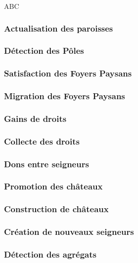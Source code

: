 ABC

\subsubsection{Actualisation des paroisses}

\subsubsection{Détection des Pôles}

\subsubsection{Satisfaction des Foyers Paysans}

\subsubsection{Migration des Foyers Paysans}

\subsubsection{Gains de droits}

\subsubsection{Collecte des droits}

\subsubsection{Dons entre seigneurs}

\subsubsection{Promotion des châteaux}

\subsubsection{Construction de châteaux}

\subsubsection{Création de nouveaux seigneurs}

\subsubsection{Détection des agrégats}

